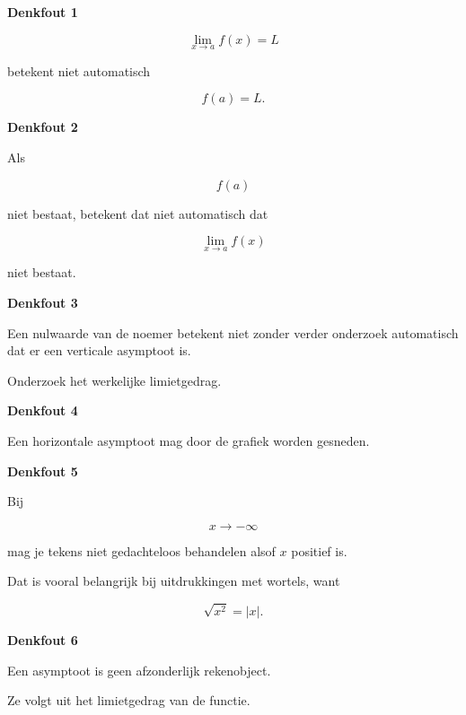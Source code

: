 \documentclass{ximera}
\begin{document}


\begin{opmerking}

\textbf{Denkfout 1}

\[
\lim_{x\to a}f(x)=L
\]

betekent niet automatisch

\[
f(a)=L.
\]

\medskip

\textbf{Denkfout 2}

Als

\[
f(a)
\]

niet bestaat, betekent dat niet automatisch dat

\[
\lim_{x\to a}f(x)
\]

niet bestaat.

\medskip

\textbf{Denkfout 3}

Een nulwaarde van de noemer betekent niet zonder verder onderzoek
automatisch dat er een verticale asymptoot is.

Onderzoek het werkelijke limietgedrag.

\medskip

\textbf{Denkfout 4}

Een horizontale asymptoot mag door de grafiek worden gesneden.

\medskip

\textbf{Denkfout 5}

Bij

\[
x\to-\infty
\]

mag je tekens niet gedachteloos behandelen alsof $x$ positief is.

Dat is vooral belangrijk bij uitdrukkingen met wortels, want

\[
\sqrt{x^2}=|x|.
\]

\medskip

\textbf{Denkfout 6}

Een asymptoot is geen afzonderlijk rekenobject.

Ze volgt uit het limietgedrag van de functie.

\end{opmerking}


\end{document}
